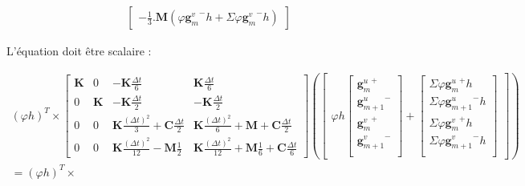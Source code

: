 \documentclass[12pt,a4paper]{report}
\begin{document}
\begin{equation}
\begin{array}{c}
\begin{bmatrix}
			- \frac{1}{3} .  \mathbf{M} (\varphi {\mathbf{g}^v_m}^- h + \Sigma \varphi {\mathbf{g}^v_m}^- h)
	\end{bmatrix}
\end{array}
\end{equation}
 
 L'équation doit être scalaire :
 
\begin{equation}
\!\!\!\!\!\!\!\!\!\!\!\!\!\!\!\!\!
\begin{array}{c}
	(\varphi h)^T \times
		\begin{bmatrix}   
		   		\mathbf{K}
			&
		   		0
		   	&
			   	-\mathbf{K} \frac{\Delta t}{6} 
		   	&
		   		\mathbf{K} \frac{\Delta t}{6} 
		\\ 	     
			   0 
			&
				\mathbf{K} 
		   	&
		   		-\mathbf{K} \frac{\Delta t}{2} 
		   	&
		   		-\mathbf{K} \frac{\Delta t}{2}
		\\   
		   		0
		   	& 
		   		0
		   	&
			   	\mathbf{K}
			   		\frac{(\Delta t)^2}{3} 
		   		+\mathbf{C} \frac{\Delta t}{2}
		   	&
		   		\mathbf{K} \frac{(\Delta t)^2}{6} 
		   		+\mathbf{M} 
			   	+\mathbf{C} \frac{\Delta t}{2}
		\\    
		   		0
		   	&
		   		0
		   	&
		   		\mathbf{K} \frac{(\Delta t)^2}{12}
		   		-\mathbf{M}
			   		\frac{1}{2} 
		   	&
		   		\mathbf{K} \frac{(\Delta t)^2}{12}
		   		+\mathbf{M} \frac{1}{6} 
			   +\mathbf{C} \frac{\Delta t}{6} 
	\end{bmatrix}
	\left(
	\begin{bmatrix}
		\varphi h \begin{bmatrix}
		   {\mathbf{g}^u_m}^+  		\\
		   {\mathbf{g}^u_{m+1}}^-  	\\
		   {\mathbf{g}^v_m}^+  		\\
		   {\mathbf{g}^v_{m+1}}^-  	\\
		\end{bmatrix}
		+
		\begin{bmatrix}
		   \Sigma \varphi {\mathbf{g}^u_m}^+ h 		\\
		   \Sigma \varphi {\mathbf{g}^u_{m+1}}^- h  	\\
		   \Sigma \varphi {\mathbf{g}^v_m}^+ h 		\\
		   \Sigma \varphi {\mathbf{g}^v_{m+1}}^- h 	\\
		\end{bmatrix}
	\end{bmatrix}
	\right)
	\\ =	
			(\varphi h)^T \times

\end{array}
\end{equation}
\end{document}
